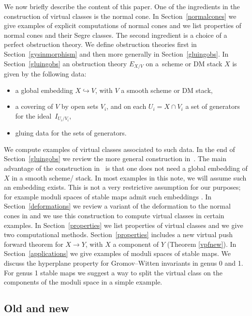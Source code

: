 \documentclass[pdftex]{sigma}
\numberwithin{equation}{section}
\theoremstyle{plain}
\theoremstyle{definition}
\theoremstyle{remark}
\begin{document}
We now briefly describe the content of this paper. One of the ingredients in the construction of virtual classes is the normal cone. In Section~\ref{normalcones} we give examples of explicit computations of normal cones and we list properties of normal cones and their Segre classes. The second ingredient is a choice of a perfect obstruction theory. We define obstruction theories first in Section~\ref{gysinmorphism} and then more generally in Section~\ref{gluingobs}. In Section~\ref{gluingobs} an obstruction theory $E_{X/V}$ on a~scheme or DM stack $X$ is given by the following data:
\begin{itemize}\itemsep=0pt
\item a global embedding $X\hookrightarrow V$, with $V$ a smooth scheme or DM stack,
\item a covering of $V$ by open sets $V_i$, and on each $U_i=X\cap V_i$ a set of generators for the ideal~$I_{U_i/V_i}$,
\item gluing data for the sets of generators.
\end{itemize}
We compute examples of virtual classes associated to such data. In the end of Section~\ref{gluingobs} we review the more general construction in~\cite{BerFan}. The main advantage of the construction in~\cite{BerFan} is that one does not need a global embedding of $X$ in a smooth scheme/ stack. In most examples in this note, we will assume such an embedding exists. This is not a very restrictive assumption for our purposes; for example moduli spaces of stable maps admit such embeddings \cite[Appendix~A]{grpa}. In Section~\ref{deformations} we review a variant of the deformation to the normal cones in \cite{KKP} and we use this construction to compute virtual classes in certain examples. In Section~\ref{properties} we list properties of virtual classes and we give two computational methods. Section~\ref{properties} includes a new virtual push forward theorem for $X\to Y$, with $X$ a component of $Y$ (Theorem \ref{vpfnew}). In Section~\ref{applications} we give examples of moduli spaces of stable maps. We discuss the hyperplane property for Gromov--Witten invariants in genus 0 and 1. For genus 1 stable maps we suggest a way to split the virtual class on the components of the moduli space in a simple example.

\subsection*{Old and new}
\end{document}
